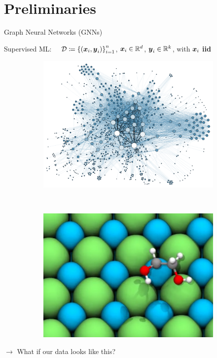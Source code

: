 \section{Preliminaries}

\begin{frame}{Graph Neural Networks (GNNs)}

    Supervised ML: $\quad \mathcal{D} \coloneqq \left\{(\boldsymbol{x}_i, \boldsymbol{y}_i)\right\}_{i=1}^n$, $\boldsymbol{x}_i \in \mathbb{R}^{d}$, $\boldsymbol{y}_i \in \mathbb{R}^k$, with $\boldsymbol{x}_i$ \textbf{iid}

    \begin{figure}[H]
        \begin{subfigure}[t]{0.3\textwidth}
            \includegraphics[width=\textwidth]{figures/gnns/social_network.png}
        \end{subfigure} \hspace*{1em}%
        ~
        \begin{subfigure}[t]{0.3\textwidth}
            \includegraphics[width=\textwidth]{figures/gnns/molecule.png}
        \end{subfigure}
        \vspace*{-1em}
    \end{figure}

    $\rightarrow$ What if our data looks like this?

\end{frame}

